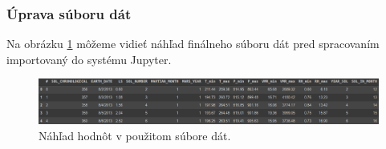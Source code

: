 \subsubsection{Úprava súboru dát}
Na obrázku \ref{dataset} môžeme vidieť náhľad finálneho súboru dát pred spracovaním importovaný do systému Jupyter.
\begin{figure}[!htbp]
  \centering
  \includegraphics[width=14cm]{img/datase.png}
  \caption{Náhľad hodnôt v použitom súbore dát.}
  \label{dataset}
\end{figure}

